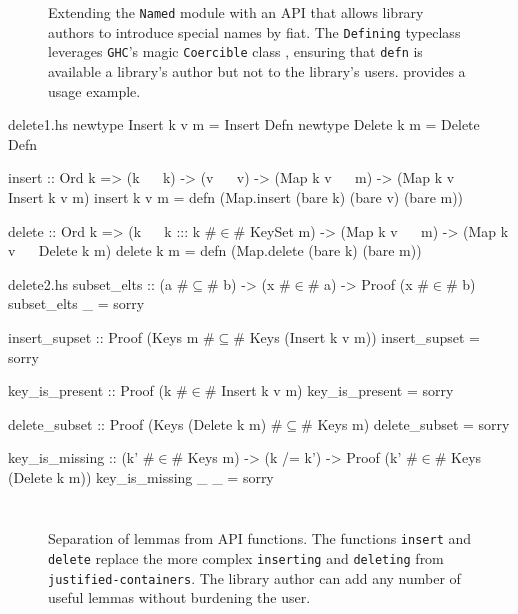 \documentclass[format=sigplan, review=false, screen=true]{acmart}
\begin{document}
\begin{figure}
  \inputminted{haskell}{defn.hs}
  \caption{Extending the \texttt{Named} module with
    an API that allows library authors to introduce
    special names by fiat. The \texttt{Defining} typeclass
    leverages \texttt{GHC}'s magic \texttt{Coercible} class \cite{Breitner:2014:SZC:2692915.2628141},
    ensuring that \texttt{defn} is available a library's author but not
    to the library's users.  provides a usage example.}
\end{figure}

\begin{filecontents*}{delete1.hs}
newtype Insert k v m = Insert Defn
newtype Delete k m   = Delete Defn

insert :: Ord k
       => (k ~~ k)
       -> (v ~~ v)
       -> (Map k v ~~ m)
       -> (Map k v ~~ Insert k v m)
insert k v m =
    defn (Map.insert (bare k) (bare v) (bare m))
       
delete :: Ord k
       => (k ~~ k ::: k #$\in$# KeySet m)
       -> (Map k v ~~ m)
       -> (Map k v ~~ Delete k m)
delete k m = defn (Map.delete (bare k) (bare m))
\end{filecontents*}
\begin{filecontents*}{delete2.hs}
subset_elts :: (a #$\subseteq$# b) -> (x #$\in$# a)
            -> Proof (x #$\in$# b)
subset_elts _ = sorry

insert_supset :: Proof (Keys m #$\subseteq$# Keys (Insert k v m))
insert_supset = sorry

key_is_present :: Proof (k #$\in$# Insert k v m)
key_is_present = sorry

delete_subset :: Proof (Keys (Delete k m) #$\subseteq$# Keys m)
delete_subset = sorry

key_is_missing  :: (k' #$\in$# Keys m) -> (k /= k')
                -> Proof (k' #$\in$# Keys (Delete k m))
key_is_missing _ _ = sorry                
\end{filecontents*}

\begin{figure*}
  \begin{minipage}{0.49\textwidth}
    \inputminted{haskell}{delete1.hs}
  \end{minipage}
  \begin{minipage}{0.49\textwidth}
    \inputminted{haskell}{delete2.hs}
  \end{minipage}
  \caption{Separation of lemmas from API functions. The functions
    \texttt{insert} and \texttt{delete} replace the more complex
    \texttt{inserting} and \texttt{deleting} from \texttt{justified-containers}.
    The library author can add any number of useful lemmas without burdening the
    user. \label{lemma-demo}}
\end{figure*}
\end{document}
